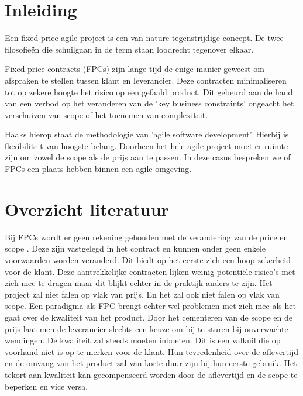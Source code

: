 \documentclass{hogent-article}
\affiliation{
    \textsuperscript{1} \href{mailto:indy.vancanegem@student.hogent.be}{indy.vancanegem@student.hogent.be}}
\affiliation{
    \textsuperscript{2} \href{mailto:mout.pessemier@student.hogent.be}{mout.pessemier@student.hogent.be}}
\affiliation{
    \textsuperscript{3} \href{mailto:nante.vermeulen@student.hogent.be}{nante.vermeulen@student.hogent.be}}
\affiliation{
    \textsuperscript{4} \href{mailto:jef.malfliet@student.hogent.be}{jef.malfliet@student.hogent.be}
}
\begin{document}
	
    \flushbottom
    \maketitle
    \tableofcontents 
    \thispagestyle{empty} %
	
	\section{Inleiding}
	 Een fixed-price agile project is een van nature tegenstrijdige concept. De twee filosofieën die schuilgaan in de term staan loodrecht tegenover elkaar.
     
     Fixed-price contracts (FPCs) zijn lange tijd de enige manier geweest om afspraken te stellen tussen klant en leverancier. Deze contracten minimaliseren tot op zekere hoogte het risico op een gefaald product. Dit gebeurd aan de hand van een verbod op het veranderen van de 'key business constraints' ongeacht het verschuiven van scope of het toenemen van complexiteit.
     
     Haaks hierop staat de methodologie van 'agile software development'. Hierbij is flexibiliteit van hoogste belang. Doorheen het hele agile project moet er ruimte zijn om zowel de scope als de prijs aan te passen. In deze casus bespreken we of FPCs een plaats hebben binnen een agile omgeving.
	
	\section{Overzicht literatuur}
	
    
	Bij FPCs wordt er geen rekening gehouden met de verandering van de price en scope \autocite{SCRUM2012}. Deze zijn vastgelegd in het contract en kunnen onder geen enkele voorwaarden worden veranderd. Dit biedt op het eerste zich een hoop zekerheid voor de klant. Deze aantrekkelijke contracten lijken weinig potentiële risico's met zich mee te dragen maar dit blijkt echter in de praktijk anders te zijn. Het project zal niet falen op vlak van prijs. En het zal ook niet falen op vlak van scope. Een paradigma als FPC brengt echter wel problemen met zich mee als het gaat over de kwaliteit van het product. Door het cementeren van de scope en de prijs laat men de leverancier slechts een keuze om bij te sturen bij onverwachte wendingen. De kwaliteit zal steeds moeten inboeten. Dit is een valkuil die op voorhand niet is op te merken voor de klant. Hun tevredenheid over de aflevertijd en de omvang van het product zal van korte duur zijn bij hun eerste gebruik. Het tekort aan kwaliteit kan gecompenseerd worden door de aflevertijd en de scope te beperken en vice versa.
    
\end{document}
